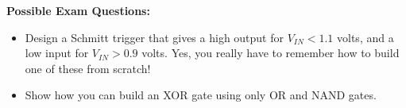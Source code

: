 \textbf{Possible Exam Questions:}

\begin{itemize}

\item Design a Schmitt trigger that gives a high output for $V_{IN}<1.1$ volts, and a low input for $V_{IN}>0.9$ volts.  Yes, you really have to remember how to build one of these from scratch!

\item Show how you can build an XOR gate using only OR and NAND gates.
\end{itemize}






